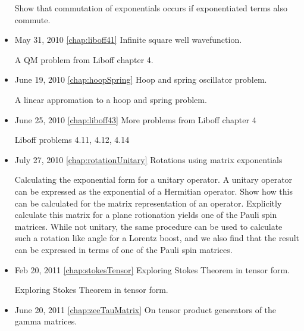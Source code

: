 \begin{itemize}
Show that commutation of exponentials occurs if exponentiated terms also commute.\item May 31, 2010 \ref{chap:liboff41} Infinite square well wavefunction.

A QM problem from Liboff chapter 4.\item June 19, 2010 \ref{chap:hoopSpring} Hoop and spring oscillator problem.

A linear appromation to a hoop and spring problem.\item June 25, 2010 \ref{chap:liboff43} More problems from Liboff chapter 4

Liboff problems 4.11, 4.12, 4.14\item July 27, 2010 \ref{chap:rotationUnitary} Rotations using matrix exponentials

Calculating the exponential form for a unitary operator.  A unitary operator can be expressed as the exponential of a Hermitian operator.  Show how this can be calculated for the matrix representation of an operator.  Explicitly calculate this matrix for a plane rotionation yields one of the Pauli spin matrices.  While not unitary, the same procedure can be used to calculate such a rotation like angle for a Lorentz boost, and we also find that the result can be expressed in terms of one of the Pauli spin matrices.\item Feb 20, 2011 \ref{chap:stokesTensor} Exploring Stokes Theorem in tensor form.

Exploring Stokes Theorem in tensor form.\item June 20, 2011 \ref{chap:zeeTauMatrix} On tensor product generators of the gamma matrices.

\end{itemize}
